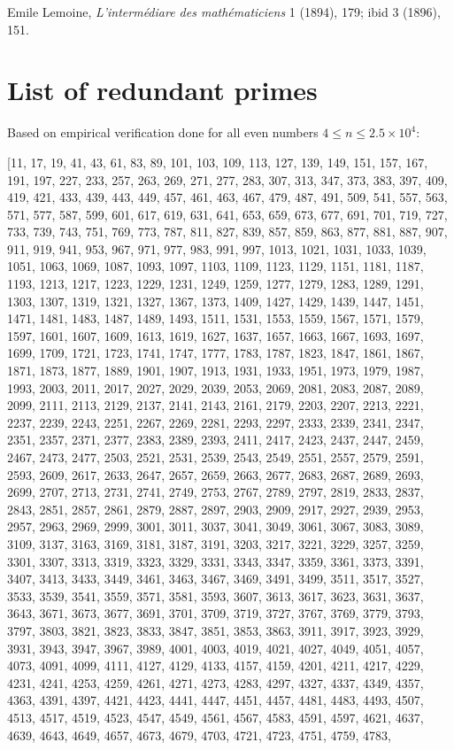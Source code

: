 \documentclass[10pt,twocolumn]{article}
\begin{document}
\begin{thebibliography}{9}
  Emile Lemoine, \emph{ L'intermédiare des mathématiciens} 1 (1894), 179; ibid 3 (1896), 151.


\appendix
\section{List of redundant primes}

Based on empirical verification done for all even numbers $4 \leq n \leq 2.5 \times 10^4$:

[11, 17, 19, 41, 43, 61, 83, 89, 101, 103, 109, 113, 127, 139, 149, 151, 157, 167, 191, 197, 227, 233, 257, 263, 269, 271, 277, 283, 307, 313, 347, 373, 383, 397, 409, 419, 421, 433, 439, 443, 449, 457, 461, 463, 467, 479, 487, 491, 509, 541, 557, 563, 571, 577, 587, 599, 601, 617, 619, 631, 641, 653, 659, 673, 677, 691, 701, 719, 727, 733, 739, 743, 751, 769, 773, 787, 811, 827, 839, 857, 859, 863, 877, 881, 887, 907, 911, 919, 941, 953, 967, 971, 977, 983, 991, 997, 1013, 1021, 1031, 1033, 1039, 1051, 1063, 1069, 1087, 1093, 1097, 1103, 1109, 1123, 1129, 1151, 1181, 1187, 1193, 1213, 1217, 1223, 1229, 1231, 1249, 1259, 1277, 1279, 1283, 1289, 1291, 1303, 1307, 1319, 1321, 1327, 1367, 1373, 1409, 1427, 1429, 1439, 1447, 1451, 1471, 1481, 1483, 1487, 1489, 1493, 1511, 1531, 1553, 1559, 1567, 1571, 1579, 1597, 1601, 1607, 1609, 1613, 1619, 1627, 1637, 1657, 1663, 1667, 1693, 1697, 1699, 1709, 1721, 1723, 1741, 1747, 1777, 1783, 1787, 1823, 1847, 1861, 1867, 1871, 1873, 1877, 1889, 1901, 1907, 1913, 1931, 1933, 1951, 1973, 1979, 1987, 1993, 2003, 2011, 2017, 2027, 2029, 2039, 2053, 2069, 2081, 2083, 2087, 2089, 2099, 2111, 2113, 2129, 2137, 2141, 2143, 2161, 2179, 2203, 2207, 2213, 2221, 2237, 2239, 2243, 2251, 2267, 2269, 2281, 2293, 2297, 2333, 2339, 2341, 2347, 2351, 2357, 2371, 2377, 2383, 2389, 2393, 2411, 2417, 2423, 2437, 2447, 2459, 2467, 2473, 2477, 2503, 2521, 2531, 2539, 2543, 2549, 2551, 2557, 2579, 2591, 2593, 2609, 2617, 2633, 2647, 2657, 2659, 2663, 2677, 2683, 2687, 2689, 2693, 2699, 2707, 2713, 2731, 2741, 2749, 2753, 2767, 2789, 2797, 2819, 2833, 2837, 2843, 2851, 2857, 2861, 2879, 2887, 2897, 2903, 2909, 2917, 2927, 2939, 2953, 2957, 2963, 2969, 2999, 3001, 3011, 3037, 3041, 3049, 3061, 3067, 3083, 3089, 3109, 3137, 3163, 3169, 3181, 3187, 3191, 3203, 3217, 3221, 3229, 3257, 3259, 3301, 3307, 3313, 3319, 3323, 3329, 3331, 3343, 3347, 3359, 3361, 3373, 3391, 3407, 3413, 3433, 3449, 3461, 3463, 3467, 3469, 3491, 3499, 3511, 3517, 3527, 3533, 3539, 3541, 3559, 3571, 3581, 3593, 3607, 3613, 3617, 3623, 3631, 3637, 3643, 3671, 3673, 3677, 3691, 3701, 3709, 3719, 3727, 3767, 3769, 3779, 3793, 3797, 3803, 3821, 3823, 3833, 3847, 3851, 3853, 3863, 3911, 3917, 3923, 3929, 3931, 3943, 3947, 3967, 3989, 4001, 4003, 4019, 4021, 4027, 4049, 4051, 4057, 4073, 4091, 4099, 4111, 4127, 4129, 4133, 4157, 4159, 4201, 4211, 4217, 4229, 4231, 4241, 4253, 4259, 4261, 4271, 4273, 4283, 4297, 4327, 4337, 4349, 4357, 4363, 4391, 4397, 4421, 4423, 4441, 4447, 4451, 4457, 4481, 4483, 4493, 4507, 4513, 4517, 4519, 4523, 4547, 4549, 4561, 4567, 4583, 4591, 4597, 4621, 4637, 4639, 4643, 4649, 4657, 4673, 4679, 4703, 4721, 4723, 4751, 4759, 4783, 
\end{thebibliography}
\end{document}
